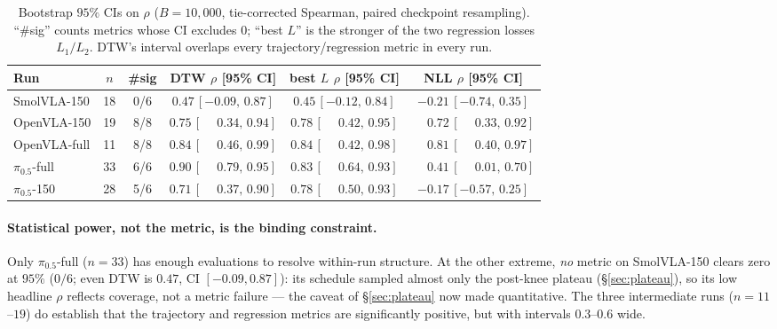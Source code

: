 \documentclass[11pt]{article}
\begin{document}
\begin{table}[h]
\centering
\caption{Bootstrap $95\%$ CIs on $\rho$ ($B{=}10{,}000$, tie-corrected Spearman, paired checkpoint
resampling). ``\#sig'' counts metrics whose CI excludes $0$; ``best $L$'' is the stronger of the two
regression losses $L_1/L_2$. DTW's interval overlaps every trajectory/regression metric in every run.}
\label{tab:ci}
\begin{tabular}{lccccc}
\toprule
Run & $n$ & \#sig & DTW $\rho$ [95\% CI] & best $L$ $\rho$ [95\% CI] & NLL $\rho$ [95\% CI] \\
\midrule
SmolVLA-150      & 18 & 0/6 & $0.47\,[-0.09,\,0.87]$ & $0.45\,[-0.12,\,0.84]$ & $-0.21\,[-0.74,\,0.35]$ \\
OpenVLA-150      & 19 & 8/8 & $0.75\,[\phantom{-}0.34,\,0.94]$  & $0.78\,[\phantom{-}0.42,\,0.95]$  & $\phantom{-}0.72\,[\phantom{-}0.33,\,0.92]$ \\
OpenVLA-full     & 11 & 8/8 & $0.84\,[\phantom{-}0.46,\,0.99]$  & $0.84\,[\phantom{-}0.42,\,0.98]$  & $\phantom{-}0.81\,[\phantom{-}0.40,\,0.97]$ \\
$\pi_{0.5}$-full & 33 & 6/6 & $0.90\,[\phantom{-}0.79,\,0.95]$  & $0.83\,[\phantom{-}0.64,\,0.93]$  & $\phantom{-}0.41\,[\phantom{-}0.01,\,0.70]$ \\
$\pi_{0.5}$-150  & 28 & 5/6 & $0.71\,[\phantom{-}0.37,\,0.90]$  & $0.78\,[\phantom{-}0.50,\,0.93]$  & $-0.17\,[-0.57,\,0.25]$ \\
\bottomrule
\end{tabular}
\end{table}

\paragraph{Statistical power, not the metric, is the binding constraint.}
Only $\pi_{0.5}$-full ($n{=}33$) has enough evaluations to resolve within-run structure. At the other
extreme, \emph{no} metric on SmolVLA-150 clears zero at $95\%$ ($0/6$; even DTW is $0.47$,
CI $[-0.09,0.87]$): its schedule sampled almost only the post-knee plateau (\S\ref{sec:plateau}), so its
low headline $\rho$ reflects coverage, not a metric failure --- the caveat of \S\ref{sec:plateau} now made
quantitative. The three intermediate runs ($n{=}11$--$19$) do establish that the trajectory and
regression metrics are significantly positive, but with intervals $0.3$--$0.6$ wide.
\end{document}

